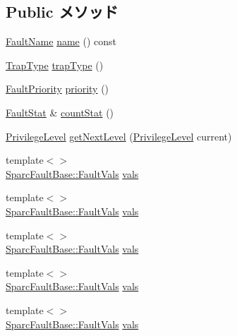 \subsection*{Public メソッド}
\begin{DoxyCompactItemize}
\item 
\hyperlink{sim_2faults_8hh_abb196df64725e5c2568c900cf130d8d7}{FaultName} \hyperlink{classSparcISA_1_1SparcFault_a73adb23259baf912a81683a9790a303f}{name} () const 
\item 
\hyperlink{namespaceSparcISA_aabeb6cc11127ef5b6ebc776bfc5fb95b}{TrapType} \hyperlink{classSparcISA_1_1SparcFault_aa059963bc65ed73d2d744374cd6da5b1}{trapType} ()
\item 
\hyperlink{namespaceSparcISA_ab4ef46911de05ddf45ea58ee440ff324}{FaultPriority} \hyperlink{classSparcISA_1_1SparcFault_a57b9ac2b92afbf2567e6d7b131900712}{priority} ()
\item 
\hyperlink{classStats_1_1Scalar}{FaultStat} \& \hyperlink{classSparcISA_1_1SparcFault_a6c79663c761ff57265459f7e3aefaf4c}{countStat} ()
\item 
\hyperlink{classSparcISA_1_1SparcFaultBase_a4cf6b4de13e22b76c2be9d329d8a9b1a}{PrivilegeLevel} \hyperlink{classSparcISA_1_1SparcFault_a58c48783e8f5974a57301021b9dba072}{getNextLevel} (\hyperlink{classSparcISA_1_1SparcFaultBase_a4cf6b4de13e22b76c2be9d329d8a9b1a}{PrivilegeLevel} current)
\item 
{\footnotesize template$<$$>$ }\\\hyperlink{structSparcISA_1_1SparcFaultBase_1_1FaultVals}{SparcFaultBase::FaultVals} \hyperlink{classSparcISA_1_1SparcFault_a88174a6ce260cacb323e0d78465e4c52}{vals}
\item 
{\footnotesize template$<$$>$ }\\\hyperlink{structSparcISA_1_1SparcFaultBase_1_1FaultVals}{SparcFaultBase::FaultVals} \hyperlink{classSparcISA_1_1SparcFault_a88174a6ce260cacb323e0d78465e4c52}{vals}
\item 
{\footnotesize template$<$$>$ }\\\hyperlink{structSparcISA_1_1SparcFaultBase_1_1FaultVals}{SparcFaultBase::FaultVals} \hyperlink{classSparcISA_1_1SparcFault_a88174a6ce260cacb323e0d78465e4c52}{vals}
\item 
{\footnotesize template$<$$>$ }\\\hyperlink{structSparcISA_1_1SparcFaultBase_1_1FaultVals}{SparcFaultBase::FaultVals} \hyperlink{classSparcISA_1_1SparcFault_a88174a6ce260cacb323e0d78465e4c52}{vals}
\item 
{\footnotesize template$<$$>$ }\\\hyperlink{structSparcISA_1_1SparcFaultBase_1_1FaultVals}{SparcFaultBase::FaultVals} \hyperlink{classSparcISA_1_1SparcFault_a88174a6ce260cacb323e0d78465e4c52}{vals}

\end{DoxyCompactItemize}
